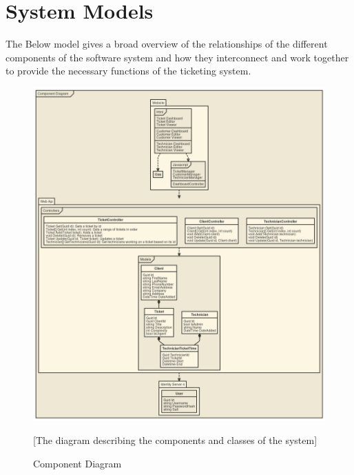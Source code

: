 \documentclass[letterpaper]{article}
\begin{document}
\pagebreak

\section{System Models}
The Below model gives a broad overview of the relationships of the different components of the software system and how they interconnect and work together to provide the necessary functions of the ticketing system.
\begin{figure}[htbp]
  \includegraphics[scale =.3]{ComponentDiagram}
  \caption{Component Diagram}[The diagram describing the components and classes of the system]
  \centering
\end{figure}

\pagebreak

\end{document}
